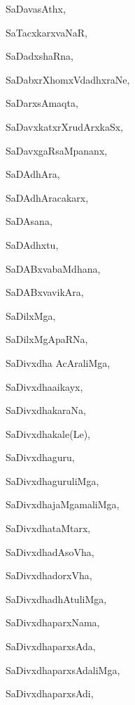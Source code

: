 \begin{multicols}{2}
{SaDavasAthx}, \pageref{SaDavasAthx}

{SaTacxkarxvaNaR}, \pageref{SaTacxkarxvaNaR}

{SaDadxshaRna}, \pageref{SaDadxshaRna}

{SaDabxrXhomxVdadhxraNe}, \pageref{SaDabxrXhomxVdadhxraNe}

{SaDarxsAmaqta}, \pageref{SaDarxsAmaqta}

{SaDavxkatxrXrudArxkaSx}, \pageref{SaDavxkatxrXrudArxkaSx}

{SaDavxgaRsaMpananx}, \pageref{SaDavxgaRsaMpananx}

{SaDAdhAra}, \pageref{SaDAdhAra}

{SaDAdhAracakarx}, \pageref{SaDAdhAracakarx}

{SaDAsana}, \pageref{SaDAsana}

{SaDAdhxtu}, \pageref{SaDAdhxtu}

{SaDABxvabaMdhana}, \pageref{SaDABxvabaMdhana}

{SaDABxvavikAra}, \pageref{SaDABxvavikAra}

{SaDilxMga}, \pageref{SaDilxMga}

{SaDilxMgApaRNa}, \pageref{SaDilxMgApaRNa}

{SaDivxdha AcAraliMga}, \pageref{SaDivxdhaAcAraliMga}

{SaDivxdha{ai}kayx}, 

{SaDivxdhakaraNa}, \pageref{SaDivxdhakaraNa}

{SaDivxdhakale(Le)}, \pageref{SaDivxdhakaleLe}

{SaDivxdhaguru}, \pageref{SaDivxdhaguru}

{SaDivxdhaguruliMga}, \pageref{SaDivxdhaguruliMga}

{SaDivxdhajaMgamaliMga}, \pageref{SaDivxdhajaMgamaliMga}

{SaDivxdhataMtarx}, \pageref{SaDivxdhataMtarx}

{SaDivxdhadAsoVha}, \pageref{SaDivxdhadAsoVha}

{SaDivxdhadorxVha}, \pageref{SaDivxdhadorxVha}

{SaDivxdhadhAtuliMga}, \pageref{SaDivxdhadhAtuliMga}

{SaDivxdhaparxNama}, \pageref{SaDivxdhaparxNama}

{SaDivxdhaparxsAda}, \pageref{SaDivxdhaparxsAda}

{SaDivxdhaparxsAdaliMga}, \pageref{SaDivxdhaparxsAdaliMga}

{SaDivxdhaparxsAdi}, \pageref{SaDivxdhaparxsAdi}


\end{multicols}
